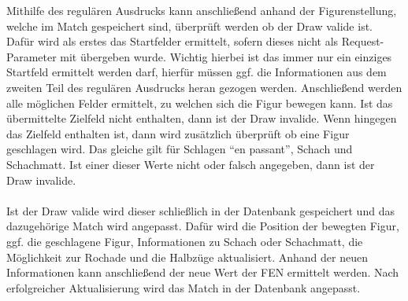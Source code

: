 Mithilfe des regulären Ausdrucks kann anschließend anhand der Figurenstellung, welche im Match gespeichert sind, überprüft werden ob der Draw valide ist. Dafür wird als erstes das Startfelder ermittelt, sofern dieses nicht als Request-Parameter mit übergeben wurde. Wichtig hierbei ist das immer nur ein einziges Startfeld ermittelt werden darf, hierfür müssen ggf. die Informationen aus dem zweiten Teil des regulären Ausdrucks heran gezogen werden. Anschließend werden alle möglichen Felder ermittelt, zu welchen sich die Figur bewegen kann. Ist das übermittelte Zielfeld nicht enthalten, dann ist der Draw invalide. Wenn hingegen das Zielfeld enthalten ist, dann wird zusätzlich überprüft ob eine Figur geschlagen wird. Das gleiche gilt für Schlagen \enquote{en passant}, Schach und Schachmatt. Ist einer dieser Werte nicht oder falsch angegeben, dann ist der Draw invalide.\\
\\
Ist der Draw valide wird dieser schließlich in der Datenbank gespeichert und das dazugehörige Match wird angepasst. Dafür wird die Position der bewegten Figur, ggf. die geschlagene Figur, Informationen zu Schach oder Schachmatt, die Möglichkeit zur Rochade und die Halbzüge aktualisiert. Anhand der neuen Informationen kann anschließend der neue Wert der FEN ermittelt werden. Nach erfolgreicher Aktualisierung wird das Match in der Datenbank angepasst.